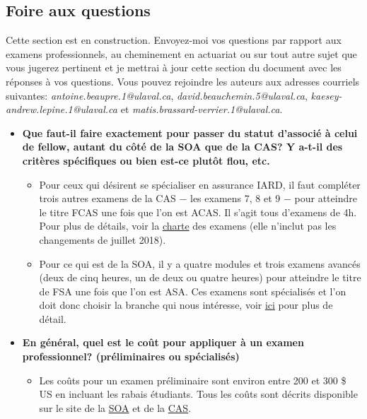 \subsection*{Foire aux questions}
\label{subsec:faq}
Cette section est en construction. Envoyez-moi vos questions par rapport aux examens professionnels, au cheminement en actuariat ou sur tout autre sujet que vous jugerez pertinent et je mettrai à jour cette section du document avec les réponses à vos questions. Vous pouvez rejoindre les auteurs aux adresses courriels suivantes: \emph{antoine.beaupre.1@ulaval.ca}, \emph{david.beauchemin.5@ulaval.ca}, \emph{kaesey-andrew.lepine.1@ulaval.ca} et \emph{matis.brassard-verrier.1@ulaval.ca}.\newline

\begin{itemize}
\item \textbf{Que faut-il faire exactement pour passer du statut d’associé à celui de fellow, autant du côté de la SOA que de la CAS? Y a-t-il des critères spécifiques ou bien est-ce plutôt flou, etc.}
	\begin{itemize}
	\item Pour ceux qui désirent se spécialiser en assurance IARD, il faut compléter trois autres examens de la CAS $-$ les examens 7, 8 et 9 $-$ pour atteindre le titre FCAS une fois que l'on est ACAS. Il s'agit tous d'examens de 4h. Pour plus de détails, voir la \href{http://www.casact.org/admissions/process/}{charte} des examens (elle n'inclut pas les changements de juillet 2018). 
	\item Pour ce qui est de la SOA, il y a quatre modules et trois examens avancés (deux de cinq heures, un de deux ou quatre heures) pour atteindre le titre de FSA une fois que l'on est ASA. Ces examens sont spécialisés et l'on doit donc choisir la branche qui nous intéresse, voir \href{https://www.soa.org/Education/Exam-Req/edu-fsa-req.aspx}{ici} pour plus de détail.
	\end{itemize}
\item \textbf{En général, quel est le coût pour appliquer à un examen professionnel? (préliminaires ou spécialisés)}
	\begin{itemize}
	\item Les coûts pour un examen préliminaire sont environ entre 200 et 300 \$ US en incluant les rabais étudiants. Tous les coûts sont décrits disponible sur le site de la \href{https://www.soa.org/Education/Exam-Req/Syllabus-Study-Materials/Exam-and-Module-Fees.aspx}{SOA} et de la \href{http://www.casact.org/admissions/exams/}{CAS}.

\end{itemize}
\end{itemize}
